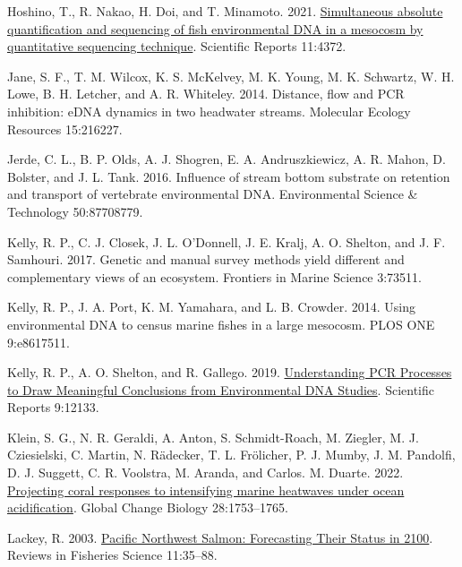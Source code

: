 \documentclass[
]{article}
\newlength{\cslhangindent}
\newlength{\cslentryspacingunit} %
\newenvironment{CSLReferences}[2] %
 {%
  \setlength{\parindent}{0pt}
  \ifodd #1
  \let\oldpar\par
  \def\par{\hangindent=\cslhangindent\oldpar}
  \fi
  \setlength{\parskip}{#2\cslentryspacingunit}
 }%
 {}
\begin{document}
\begin{CSLReferences}{1}{0}
\leavevmode{}%
Hoshino, T., R. Nakao, H. Doi, and T. Minamoto. 2021.
\href{https://doi.org/10.1038/s41598-021-83318-6}{Simultaneous absolute
quantification and sequencing of fish environmental DNA in a mesocosm by
quantitative sequencing technique}. Scientific Reports 11:4372.

\leavevmode{}%
Jane, S. F., T. M. Wilcox, K. S. McKelvey, M. K. Young, M. K. Schwartz,
W. H. Lowe, B. H. Letcher, and A. R. Whiteley. 2014. Distance, flow and
PCR inhibition: eDNA dynamics in two headwater streams. Molecular
Ecology Resources 15:216227.

\leavevmode{}%
Jerde, C. L., B. P. Olds, A. J. Shogren, E. A. Andruszkiewicz, A. R.
Mahon, D. Bolster, and J. L. Tank. 2016. Influence of stream bottom
substrate on retention and transport of vertebrate environmental DNA.
Environmental Science \& Technology 50:87708779.

\leavevmode{}%
Kelly, R. P., C. J. Closek, J. L. O'Donnell, J. E. Kralj, A. O. Shelton,
and J. F. Samhouri. 2017. Genetic and manual survey methods yield
different and complementary views of an ecosystem. Frontiers in Marine
Science 3:73511.

\leavevmode{}%
Kelly, R. P., J. A. Port, K. M. Yamahara, and L. B. Crowder. 2014. Using
environmental DNA to census marine fishes in a large mesocosm. PLOS ONE
9:e8617511.

\leavevmode{}%
Kelly, R. P., A. O. Shelton, and R. Gallego. 2019.
\href{https://doi.org/10.1038/s41598-019-48546-x}{Understanding PCR
Processes to Draw Meaningful Conclusions from Environmental DNA
Studies}. Scientific Reports 9:12133.

\leavevmode{}%
Klein, S. G., N. R. Geraldi, A. Anton, S. Schmidt-Roach, M. Ziegler, M.
J. Cziesielski, C. Martin, N. Rädecker, T. L. Frölicher, P. J. Mumby, J.
M. Pandolfi, D. J. Suggett, C. R. Voolstra, M. Aranda, and Carlos. M.
Duarte. 2022. \href{https://doi.org/10.1111/gcb.15818}{Projecting coral
responses to intensifying marine heatwaves under ocean acidification}.
Global Change Biology 28:1753--1765.

\leavevmode{}%
Lackey, R. 2003.
\href{https://doi.org/10.1080/16226510390856529}{Pacific Northwest
Salmon: Forecasting Their Status in 2100}. Reviews in Fisheries Science
11:35--88.


\end{CSLReferences}
\end{document}
